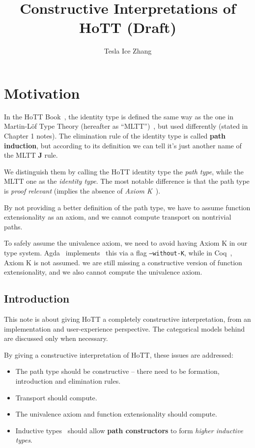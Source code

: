 \documentclass{article}
\title{Constructive Interpretations of HoTT (Draft)}
\author{Tesla Ice Zhang}
\begin{document}
\maketitle

\tableofcontents

\section{Motivation}
\label{sec:motivation}

In the HoTT Book~\cite{hottbook},
the identity type is defined the same way as the one
in Martin-L\"{o}f Type Theory (hereafter as ``MLTT'')~\cite{MLTT},
but used differently (stated in Chapter 1 notes).
The elimination rule of the identity type is called \textbf{path induction},
but according to its definition we can tell
it's just another name of the MLTT \textbf J rule.

We distinguish them by calling the HoTT identity type the \textit{path type},
while the MLTT one as the \textit{identity type}.
The most notable difference is that the path type is
\textit{proof relevant} (implies the absence of
\textit{Axiom K}~\cite{AxiomK}).

By not providing a better definition of the path type,
we have to assume function extensionality as an axiom,
and we cannot compute transport on nontrivial paths.

To safely assume the univalence axiom, we need to avoid having Axiom K
in our type system.
Agda~\cite{Agda} implements~\cite{WithoutK} this via a flag \texttt{--without-K},
while in Coq~\cite{Coq}, Axiom K is not assumed.
we are still missing a constructive version of function extensionality,
and we also cannot compute the univalence axiom.

\subsection{Introduction}
\label{subsec:introduction}

This note is about giving HoTT a completely constructive interpretation,
from an implementation and user-experience perspective.
The categorical models behind are discussed only when necessary.

By giving a constructive interpretation of HoTT,
these issues are addressed:

\begin{itemize}
\item The path type should be constructive --
  there need to be formation, introduction and elimination rules.
\item Transport should compute.
\item The univalence axiom and function extensionality should compute.
\item Inductive types~\cite{Inductive} should allow \textbf{path constructors}
  to form \textit{higher inductive types}.
\end{itemize}
\end{document}
